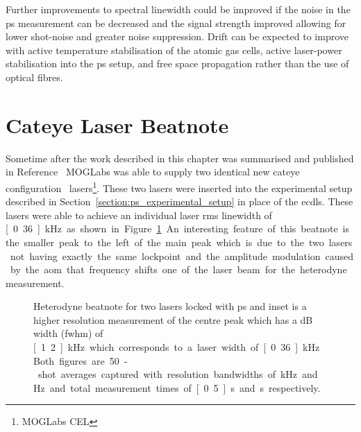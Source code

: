 Further improvements to spectral linewidth could be improved if the noise in the \gls{ps} measurement can be decreased and the signal strength improved allowing for lower shot-noise and greater noise suppression.
Drift can be expected to improve with active temperature stabilisation of the atomic gas cells, active laser-power stabilisation into the \gls{ps} setup, and free space propagation rather than the use of optical fibres.

\section{Cateye Laser Beatnote}

Sometime after the work described in this chapter was summarised and published in Reference~\cite{torrance_sub-kilohertz_2016} MOGLabs was able to supply two identical new cateye configuration~\cite{thompson_narrow_2012} lasers\footnote{MOGLabs CEL}.
These two lasers were inserted into the experimental setup described in Section~\ref{section:ps_experimental_setup} in place of the \glspl{ecdl}.
These lasers were able to achieve an individual laser \gls{rms} linewidth of \unit[0.36]{kHz} as shown in Figure~\ref{figure:cateye_beatnote}.
An interesting feature of this beatnote is the smaller peak to the left of the main peak which is due to the two lasers not having exactly the same lockpoint and the amplitude modulation caused by the \gls{aom} that frequency shifts one of the laser beam for the heterodyne measurement.

\begin{figure}
\center

\caption{Heterodyne beatnote for two lasers locked with \gls{ps} and inset is a higher resolution measurement of the centre peak which has a \unit[-3]{dB} width (\gls{fwhm}) of \unit[1.2]{kHz} which corresponds to a laser width of \unit[0.36]{kHz}.
Both figures are 50-shot averages captured with resolution bandwidths of \unit[30]{kHz} and \unit[100]{Hz} and total measurement times of \unit[0.5]{s} and \unit[2]{s} respectively.}
\label{figure:cateye_beatnote}
\end{figure}
